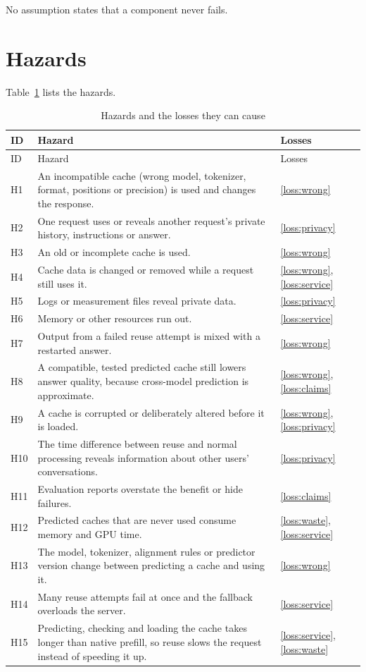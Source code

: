 \documentclass{article}
\begin{document}
No assumption states that a component never fails.

\section{Hazards}
\label{sec:hazards}

Table~\ref{tab:hazards} lists the hazards.

\begin{longtable}{@{}p{}p{}p{}@{}}
\caption{Hazards and the losses they can cause}\label{tab:hazards}\\
\toprule ID & Hazard & Losses\\\midrule\endfirsthead
\toprule ID & Hazard & Losses\\\midrule\endhead
H1 & An incompatible cache (wrong model, tokenizer, format, positions or
precision) is used and changes the response. & \ref{loss:wrong}\\
H2 & One request uses or reveals another request's private history,
instructions or answer. & \ref{loss:privacy}\\
H3 & An old or incomplete cache is used. & \ref{loss:wrong}\\
H4 & Cache data is changed or removed while a request still uses it. &
\ref{loss:wrong}, \ref{loss:service}\\
H5 & Logs or measurement files reveal private data. &
\ref{loss:privacy}\\
H6 & Memory or other resources run out. & \ref{loss:service}\\
H7 & Output from a failed reuse attempt is mixed with a restarted answer. &
\ref{loss:wrong}\\
H8 & A compatible, tested predicted cache still lowers answer quality,
because cross-model prediction is approximate. & \ref{loss:wrong},
\ref{loss:claims}\\
H9 & A cache is corrupted or deliberately altered before it is loaded. &
\ref{loss:wrong}, \ref{loss:privacy}\\
H10 & The time difference between reuse and normal processing reveals
information about other users' conversations. & \ref{loss:privacy}\\
H11 & Evaluation reports overstate the benefit or hide failures. &
\ref{loss:claims}\\
H12 & Predicted caches that are never used consume memory and GPU time. &
\ref{loss:waste}, \ref{loss:service}\\
H13 & The model, tokenizer, alignment rules or predictor version change
between predicting a cache and using it. & \ref{loss:wrong}\\
H14 & Many reuse attempts fail at once and the fallback overloads the
server. & \ref{loss:service}\\
H15 & Predicting, checking and loading the cache takes longer than native
prefill, so reuse slows the request instead of speeding it up. &
\ref{loss:service}, \ref{loss:waste}\\
\bottomrule
\end{longtable}
\end{document}
